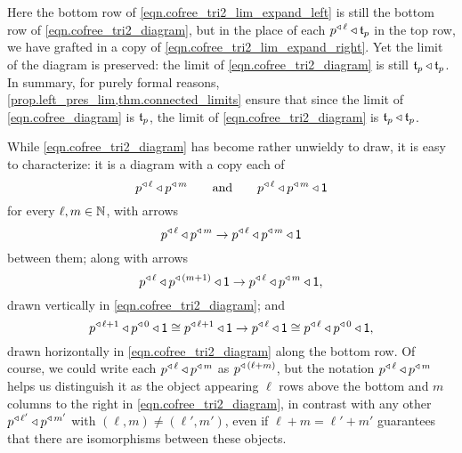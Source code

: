 \documentclass[Book-Poly]{subfiles}
\begin{document}
Here the bottom row of \eqref{eqn.cofree_tri2_lim_expand_left} is still the bottom row of \eqref{eqn.cofree_tri2_diagram}, but in the place of each $p\tripow\ell\tri\car{t}_p$ in the top row, we have grafted in a copy of \eqref{eqn.cofree_tri2_lim_expand_right}.
Yet the limit of the diagram is preserved: the limit of \eqref{eqn.cofree_tri2_diagram} is still $\car{t}_p\tri\car{t}_p$.
In summary, for purely formal reasons, \cref{prop.left_pres_lim,thm.connected_limits} ensure that since the limit of \eqref{eqn.cofree_diagram} is $\car{t}_p$, the limit of \eqref{eqn.cofree_tri2_diagram} is $\car{t}_p\tri\car{t}_p$.

While \eqref{eqn.cofree_tri2_diagram} has become rather unwieldy to draw, it is easy to characterize: it is a diagram with a copy each of
\[
    p\tripow\ell\tri p\tripow{m} \qqand p\tripow\ell\tri p\tripow{m}\tri\1
\]
for every $\ell,m\in\nn$, with arrows
\begin{equation} \label{eqn.cofree_tri2_diagram_arr_diag}
    p\tripow\ell\tri p\tripow{m}\to p\tripow\ell\tri p\tripow{m}\tri\1
\end{equation}
between them; along with arrows
\begin{equation} \label{eqn.cofree_tri2_diagram_arr_vert}
    p\tripow\ell\tri p\tripow{(m+1)}\tri\1\to p\tripow\ell\tri p\tripow{m}\tri\1,
\end{equation}
drawn vertically in \eqref{eqn.cofree_tri2_diagram}; and
\begin{equation} \label{eqn.cofree_tri2_diagram_arr_horiz}
    p\tripow{\ell+1}\tri p\tripow0\tri\1\iso p\tripow{\ell+1}\tri\1\to p\tripow\ell\tri\1\iso p\tripow\ell\tri p\tripow0\tri\1,
\end{equation}
drawn horizontally in \eqref{eqn.cofree_tri2_diagram} along the bottom row.
Of course, we could write each $p\tripow\ell\tri p\tripow{m}$ as $p\tripow{(\ell+m)}$, but the notation $p\tripow\ell\tri p\tripow{m}$ helps us distinguish it as the object appearing $\ell$ rows above the bottom and $m$ columns to the right in \eqref{eqn.cofree_tri2_diagram}, in contrast with any other $p\tripow{\ell'}\tri p\tripow{m'}$ with $(\ell,m)\neq(\ell',m')$, even if $\ell+m=\ell'+m'$ guarantees that there are isomorphisms between these objects.
\end{document}
